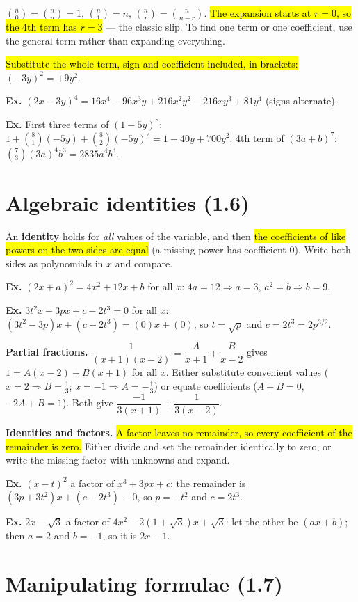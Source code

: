 \documentclass[11pt]{article}
\newcommand{\key}[1]{\hl{#1}}
\newcommand{\wex}[1]{{\color{lilacdeep}\textbf{Ex.}} #1}
\begin{document}
$\binom n0=\binom nn=1$, $\binom n1=n$, $\binom nr=\binom n{n-r}$. \key{The expansion starts at \mbox{$r=0$}, so the 4th term has \mbox{$r=3$}} --- the classic slip. To find one term or one coefficient, use the general term rather than expanding everything.

\key{Substitute the whole term, sign and coefficient included, in brackets:} $(-3y)^{2}=+9y^{2}$.

\wex{$(2x-3y)^{4}=16x^{4}-96x^{3}y+216x^{2}y^{2}-216xy^{3}+81y^{4}$ (signs alternate).}

\wex{First three terms of $(1-5y)^{8}$: $1+\binom81(-5y)+\binom82(-5y)^{2}=1-40y+700y^{2}$.
\quad 4th term of $(3a+b)^{7}$: $\binom73(3a)^{4}b^{3}=2835a^{4}b^{3}$.}

\section{Algebraic identities (1.6)}

An \textbf{identity} holds for \emph{all} values of the variable, and then \key{the coefficients of like powers on the two sides are equal} (a missing power has coefficient 0). Write both sides as polynomials in $x$ and compare.

\wex{$(2x+a)^{2}=4x^{2}+12x+b$ for all $x$: $4a=12\Rightarrow a=3$, $a^{2}=b\Rightarrow b=9$.}

\wex{$3t^{2}x-3px+c-2t^{3}=0$ for all $x$: $(3t^{2}-3p)x+(c-2t^{3})=(0)x+(0)$, so $t=\sqrt p$ and $c=2t^{3}=2p^{3/2}$.}

\textbf{Partial fractions.} $\dfrac{1}{(x+1)(x-2)}=\dfrac{A}{x+1}+\dfrac{B}{x-2}$ gives $1=A(x-2)+B(x+1)$ for all $x$. Either substitute convenient values ($x=2\Rightarrow B=\frac13$; $x=-1\Rightarrow A=-\frac13$) or equate coefficients ($A+B=0$, $-2A+B=1$). Both give $\dfrac{-1}{3(x+1)}+\dfrac{1}{3(x-2)}$.

\textbf{Identities and factors.} \key{A factor leaves no remainder, so every coefficient of the remainder is zero.} Either divide and set the remainder identically to zero, or write the missing factor with unknowns and expand.

\wex{$(x-t)^{2}$ a factor of $x^{3}+3px+c$: the remainder is $(3p+3t^{2})x+(c-2t^{3})\equiv0$, so $p=-t^{2}$ and $c=2t^{3}$.}

\wex{$2x-\sqrt3$ a factor of $4x^{2}-2(1+\sqrt3)x+\sqrt3$: let the other be $(ax+b)$; then $a=2$ and $b=-1$, so it is $2x-1$.}

\section{Manipulating formulae (1.7)}
\end{document}
